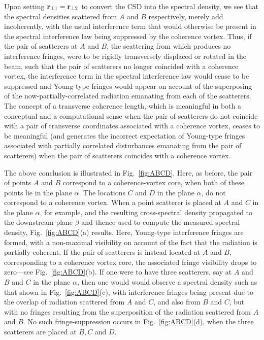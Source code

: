 \documentclass{iucr}              %
\begin{document}
Upon setting ${\bf r}_{\perp 1}={\bf r}_{\perp 2}$ to convert the CSD into the spectral density, we see that the spectral densities scattered from $A$ and $B$ respectively, merely add incoherently, with the usual interference term that would otherwise be present in the spectral interference law \cite{mandel_wolf} being suppressed by the coherence vortex.  Thus, if the pair of scatterers at $A$ and $B$, the scattering from which produces no interference fringes, were to be rigidly transversely displaced or rotated in the beam, such that the pair of scatterers no longer coincided with a coherence vortex, the interference term in the spectral interference law would cease to be suppressed and Young-type fringes would appear on account of the superposing of the now-partially-correlated radiation emanating from each of the scatterers.  The concept of a transverse coherence length, which is meaningful in both a conceptual and a computational sense when the pair of scatterers do not coincide with a pair of transverse coordinates associated with a coherence vortex, ceases to be meaningful (and generates the incorrect expectation of Young-type fringes associated with partially correlated disturbances emanating from the pair of scatterers) when the pair of scatterers coincides with a coherence vortex.     

The above conclusion is illustrated in Fig.~\ref{fig:ABCD}.  Here, as before, the pair of points $A$ and $B$ correspond to a coherence-vortex core, when both of these points lie in the plane $\alpha$. The locations $C$ and $D$ in the plane $\alpha$, do not correspond to a coherence vortex.  When a point scatterer is placed at $A$ and $C$ in the plane $\alpha$, for example, and the resulting cross-spectral density propagated to the downstream plane $\beta$ and thence used to compute the measured spectral density, Fig.~\ref{fig:ABCD}(a) results.  Here, Young-type interference fringes are formed, with a non-maximal visibility on account of the fact that the radiation is partially coherent.  If the pair of scatterers is instead located at $A$ and $B$, corresponding to a coherence vortex core, the associated fringe visibility drops to zero---see Fig.~\ref{fig:ABCD}(b).  If one were to have three scatterers, say at $A$ and $B$ and $C$ in the plane $\alpha$, then one would would observe a spectral density such as that shown in Fig.~\ref{fig:ABCD}(c), with interference fringes being present due to the overlap of radiation scattered from $A$ and $C$, and also from $B$ and $C$, but with no fringes resulting from the superposition of the radiation scattered from $A$ and $B$.    No such fringe-suppression occurs in Fig.~\ref{fig:ABCD}(d), when the three scatterers are placed at $B,C$ and $D$. 
\end{document}
